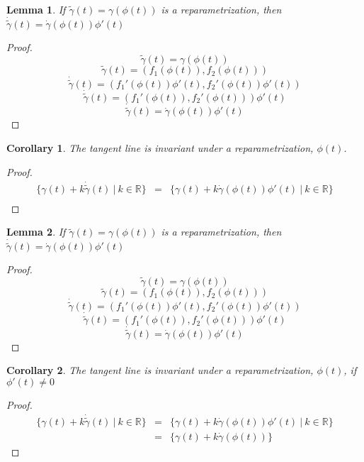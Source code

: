 \documentclass[twocolumn,20pt,fleqn]{extarticle}
\theoremstyle{plain}
\newtheorem*{lemma}{Lemma}
\newtheorem*{corollary}{Corollary}
\theoremstyle{definition}
\theoremstyle{remark}
\begin{document}
\clearpage



\begin{lemma}
If $\tilde{\gamma}(t) = \gamma(\phi(t))$ is a reparametrization, then $\dot{\tilde{\gamma}}(t) = \dot{\gamma}(\phi(t))\phi'(t)$
\end{lemma}
\begin{proof}
\[\tilde{\gamma}(t) = \gamma(\phi(t))\]
\[\tilde{\gamma}(t) = (f_1(\phi(t)), f_2(\phi(t)))\]
\[\dot{\tilde{\gamma}}(t) = (f_1'(\phi(t))\phi'(t), f_2'(\phi(t))\phi'(t))\]
\[\dot{\tilde{\gamma}}(t) = (f_1'(\phi(t)), f_2'(\phi(t)))\phi'(t)\]
\[\dot{\tilde{\gamma}}(t) = \dot{\gamma}(\phi(t))\phi'(t)\]
\end{proof}

\begin{corollary}
The tangent line is invariant under a reparametrization, $\phi(t)$.
\end{corollary}
\begin{proof}
\begin{eqnarray*}
\{\gamma(t) + k\dot{\tilde{\gamma}}(t) \ |\ k\in \mathbb{R}\} &=& \{\gamma(t) + k\dot{\gamma}(\phi(t))\phi'(t) \ |\ k\in \mathbb{R}\} \\ \end{eqnarray*}\end{proof}


\clearpage



\begin{lemma}
If $\tilde{\gamma}(t) = \gamma(\phi(t))$ is a reparametrization, then $\dot{\tilde{\gamma}}(t) = \dot{\gamma}(\phi(t))\phi'(t)$
\end{lemma}
\begin{proof}
\[\tilde{\gamma}(t) = \gamma(\phi(t))\]
\[\tilde{\gamma}(t) = (f_1(\phi(t)), f_2(\phi(t)))\]
\[\dot{\tilde{\gamma}}(t) = (f_1'(\phi(t))\phi'(t), f_2'(\phi(t))\phi'(t))\]
\[\dot{\tilde{\gamma}}(t) = (f_1'(\phi(t)), f_2'(\phi(t)))\phi'(t)\]
\[\dot{\tilde{\gamma}}(t) = \dot{\gamma}(\phi(t))\phi'(t)\]
\end{proof}

\begin{corollary}
The tangent line is invariant under a reparametrization, $\phi(t)$,  if $\phi'(t)\neq 0$ 
\end{corollary}
\begin{proof}
\begin{eqnarray*}
\{\gamma(t) + k\dot{\tilde{\gamma}}(t) \ |\ k\in \mathbb{R}\} &=& \{\gamma(t) + k\dot{\gamma}(\phi(t))\phi'(t) \ |\ k\in \mathbb{R}\} \\ 
                                                  &=& \{\gamma(t) + k\dot{\gamma}(\phi(t)) \}\end{eqnarray*}\end{proof}
\end{document}

